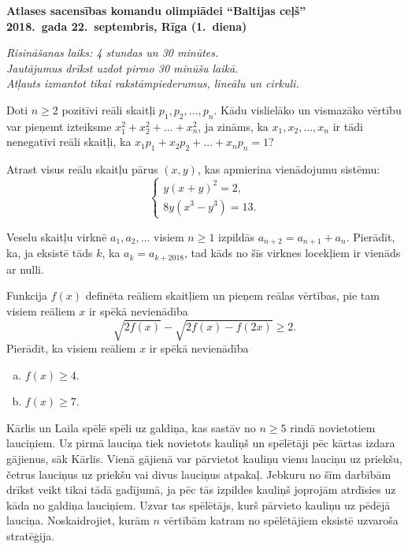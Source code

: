 \documentclass[11pt]{article}
\begin{document}
\begin{center}
{\Large \bf Atlases sacensības komandu olimpiādei ``Baltijas ceļš''}\\
{\bf 2018.\ gada 22.\ septembris, Rīga (1.\ diena)}
\end{center}

{\footnotesize \em 
Risināšanas laiks: 4 stundas un 30 minūtes.\\
Jautājumus drīkst uzdot pirmo 30 minūšu laikā.\\ 
Atļauts izmantot tikai rakstāmpiederumus, lineālu un cirkuli.
}

\begin{problem}[BwTst2018.1]
Doti $n \geq 2$ pozitīvi reāli skaitļi $p_1,p_2,\ldots,p_n$. Kādu vislielāko un 
vismazāko vērtību var pieņemt izteiksme $x_1^2 + x_2^2 + \ldots + x_n^2$, ja 
zināms, ka $x_1,x_2,\ldots,x_n$ ir tādi nenegatīvi reāli skaitļi, ka 
$x_1p_1 + x_2p_2 + \ldots + x_np_n = 1$? 
\end{problem}

\begin{problem}[BwTst2018.2]
Atrast visus reālu skaitļu pārus $(x,y)$, kas apmierina vienādojumu sistēmu: 
\[  \left\{ \begin{array}{l}
y(x+y)^2 = 2,\\
8y(x^3 - y^3) = 13.
\end{array} \right. \]
\end{problem}

\begin{problem}[BwTst2018.3]
Veselu skaitļu virknē $a_1,a_2,\ldots$ visiem $n \geq 1$ izpildās $a_{n+2} = a_{n+1} + a_n$. 
Pierādīt, ka, ja eksistē tāds $k$, ka $a_k = a_{k+2018}$, tad kāds no šīs virknes locekļiem 
ir vienāds ar nulli. 
\end{problem}

\begin{problem}[BwTst2018.4]
Funkcija $f(x)$ definēta reāliem skaitļiem un pieņem reālas vērtības, pie tam visiem reāliem $x$ ir spēkā
nevienādība
\[ \sqrt{2f(x)} - \sqrt{2f(x) - f(2x)} \geq 2. \]
Pierādīt, ka visiem reāliem $x$ ir spēkā nevienādība
\begin{enumerate}[(a)]
\item $f(x) \geq 4$.
\item $f(x) \geq 7$.
\end{enumerate}
\end{problem}


\begin{problem}[BwTst2018.5]
Kārlis un Laila spēlē spēli uz galdiņa, kas sastāv no $n \geq 5$ rindā
novietotiem lauciņiem. Uz pirmā lauciņa tiek novietots kauliņš un 
spēlētāji pēc kārtas izdara gājienus, sāk Kārlis.
Vienā gājienā var pārvietot kauliņu vienu lauciņu uz priekšu, četrus lauciņus uz 
priekšu vai divus lauciņus atpakaļ. 
Jebkuru no šīm darbībām drīkst veikt tikai tādā gadījumā, ja pēc tās izpildes 
kauliņš joprojām atrdīsies uz kāda no galdiņa lauciņiem. Uzvar tas spēlētājs, kurš pārvieto
kauliņu uz pēdējā lauciņa. 
Noskaidrojiet, kurām $n$ vērtībām katram no spēlētājiem eksistē uzvaroša stratēģija.
\end{problem}
\end{document}
